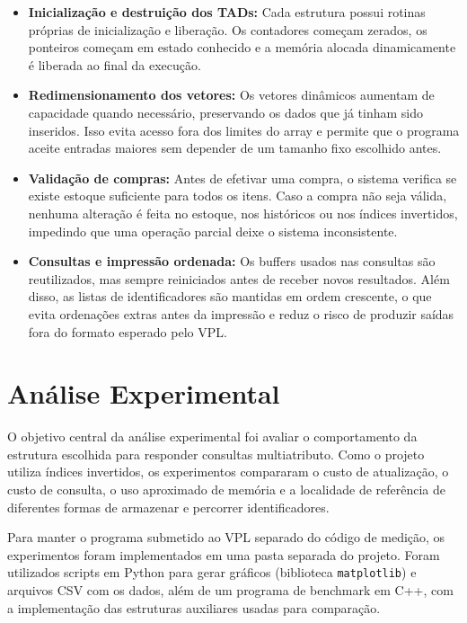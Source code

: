 \documentclass[11pt,a4paper]{article}
\begin{document}
\begin{itemize}
    \item \textbf{Inicialização e destruição dos TADs:} Cada estrutura possui rotinas próprias de inicialização e liberação. Os contadores começam zerados, os ponteiros começam em estado conhecido e a memória alocada dinamicamente é liberada ao final da execução.

    \item \textbf{Redimensionamento dos vetores:} Os vetores dinâmicos aumentam de capacidade quando necessário, preservando os dados que já tinham sido inseridos. Isso evita acesso fora dos limites do array e permite que o programa aceite entradas maiores sem depender de um tamanho fixo escolhido antes.

    \item \textbf{Validação de compras:} Antes de efetivar uma compra, o sistema verifica se existe estoque suficiente para todos os itens. Caso a compra não seja válida, nenhuma alteração é feita no estoque, nos históricos ou nos índices invertidos, impedindo que uma operação parcial deixe o sistema inconsistente.

    \item \textbf{Consultas e impressão ordenada:} Os buffers usados nas consultas são reutilizados, mas sempre reiniciados antes de receber novos resultados. Além disso, as listas de identificadores são mantidas em ordem crescente, o que evita ordenações extras antes da impressão e reduz o risco de produzir saídas fora do formato esperado pelo VPL.
\end{itemize}



\section{Análise Experimental}

O objetivo central da análise experimental foi avaliar o comportamento da estrutura escolhida para responder consultas multiatributo. Como o projeto utiliza índices invertidos, os experimentos compararam o custo de atualização, o custo de consulta, o uso aproximado de memória e a localidade de referência de diferentes formas de armazenar e percorrer identificadores.

Para manter o programa submetido ao VPL separado do código de medição, os experimentos foram implementados em uma pasta separada do projeto. Foram utilizados scripts em Python para gerar gráficos (biblioteca \texttt{matplotlib}) e arquivos CSV com os dados, além de um programa de benchmark em C++, com a implementação das estruturas auxiliares usadas para comparação.
\end{document}
